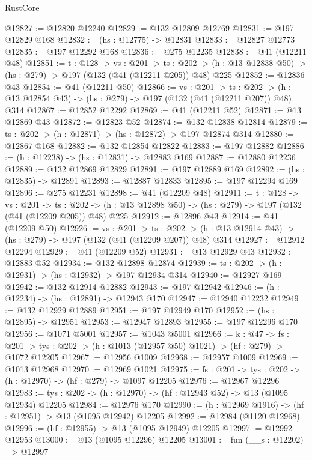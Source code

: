 \begin{lexlean}{RustCore}
\begin{coremodule}
@12827 := @12820 @12240
@12829 := @132 @12809 @12769
@12831 := @197 @12829 @168
@12832 := (hs : @12775) -> @12831
@12833 := @12827 @12773
@12835 := @197 @12292 @168
@12836 := @275 @12235
@12838 := @41 (@12211 @48)
@12851 := {t : @128} ->
  {vs : @201} ->
  {ts : @202} -> (h : @13 @12838 @50) -> (hs : @279) -> @197 (@132 (@41 (@12211 @205)) @48) @225
@12852 := @12836 @43
@12854 := @41 (@12211 @50)
@12866 := {vs : @201} ->
  {ts : @202} -> (h : @13 @12854 @43) -> (hs : @279) -> @197 (@132 (@41 (@12211 @207)) @48) @314
@12867 := @12852 @12292
@12869 := @41 (@12211 @52)
@12871 := @13 @12869 @43
@12872 := @12823 @52
@12874 := @132 @12838 @12814
@12879 := {ts : @202} -> (h : @12871) -> (hs : @12872) -> @197 @12874 @314
@12880 := @12867 @168
@12882 := @132 @12854 @12822
@12883 := @197 @12882
@12886 := (h : @12238) -> (hs : @12831) -> @12883 @169
@12887 := @12880 @12236
@12889 := @132 @12869 @12829
@12891 := @197 @12889 @169
@12892 := (hs : @12835) -> @12891
@12893 := @12887 @12833
@12895 := @197 @12294 @169
@12896 := @275 @12231
@12898 := @41 (@12209 @48)
@12911 := {t : @128} ->
  {vs : @201} ->
  {ts : @202} -> (h : @13 @12898 @50) -> (hs : @279) -> @197 (@132 (@41 (@12209 @205)) @48) @225
@12912 := @12896 @43
@12914 := @41 (@12209 @50)
@12926 := {vs : @201} ->
  {ts : @202} -> (h : @13 @12914 @43) -> (hs : @279) -> @197 (@132 (@41 (@12209 @207)) @48) @314
@12927 := @12912 @12294
@12929 := @41 (@12209 @52)
@12931 := @13 @12929 @43
@12932 := @12883 @52
@12934 := @132 @12898 @12874
@12939 := {ts : @202} -> (h : @12931) -> (hs : @12932) -> @197 @12934 @314
@12940 := @12927 @169
@12942 := @132 @12914 @12882
@12943 := @197 @12942
@12946 := (h : @12234) -> (hs : @12891) -> @12943 @170
@12947 := @12940 @12232
@12949 := @132 @12929 @12889
@12951 := @197 @12949 @170
@12952 := (hs : @12895) -> @12951
@12953 := @12947 @12893
@12955 := @197 @12296 @170
@12956 := @1071 @5001
@12957 := @1043 @5001
@12966 := {k : @47} ->
  {fs : @201} -> {tys : @202} -> (h : @1013 (@12957 @50) @1021) -> (hf : @279) -> @1072 @12205
@12967 := @12956 @1009
@12968 := @12957 @1009
@12969 := @1013 @12968
@12970 := @12969 @1021
@12975 := {fs : @201} -> {tys : @202} -> (h : @12970) -> (hf : @279) -> @1097 @12205
@12976 := @12967 @12296
@12983 := {tys : @202} -> (h : @12970) -> (hf : @12943 @52) -> @13 (@1095 @12934) @12205
@12984 := @12976 @170
@12990 := (h : @12969 @1916) -> (hf : @12951) -> @13 (@1095 @12942) @12205
@12992 := @12984 (@1120 @12968)
@12996 := (hf : @12955) -> @13 (@1095 @12949) @12205
@12997 := @12992 @12953
@13000 := @13 (@1095 @12296) @12205
@13001 := fun (__s : @12202) => @12997

\end{coremodule}
\end{lexlean}
